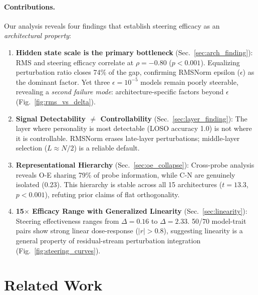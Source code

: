 \documentclass{article}
\begin{document}
\paragraph{Contributions.} Our analysis reveals four findings that establish steering efficacy as an \emph{architectural property}:
\begin{enumerate}[leftmargin=*,topsep=2pt,itemsep=1pt]
\item \textbf{Hidden state scale is the primary bottleneck} (Sec.~\ref{sec:arch_finding}): RMS and steering efficacy correlate at $\rho{=}{-}0.80$ ($p{<}0.001$). Equalizing perturbation ratio closes 74\% of the gap, confirming RMSNorm epsilon ($\epsilon$) as the dominant factor. Yet three $\epsilon{=}10^{-5}$ models remain poorly steerable, revealing a \emph{second failure mode}: architecture-specific factors beyond $\epsilon$ (Fig.~\ref{fig:rms_vs_delta}).
\item \textbf{Signal Detectability $\neq$ Controllability} (Sec.~\ref{sec:layer_finding}): The layer where personality is most detectable (LOSO accuracy 1.0) is not where it is controllable. RMSNorm erases late-layer perturbations; middle-layer selection ($L \approx N/2$) is a reliable default.
\item \textbf{Representational Hierarchy} (Sec.~\ref{sec:oe_collapse}): Cross-probe analysis reveals O-E sharing 79\% of probe information, while C-N are genuinely isolated ($0.23$). This hierarchy is stable across all 15 architectures ($t{=}13.3$, $p{<}0.001$), refuting prior claims of flat orthogonality.
\item \textbf{15$\times$ Efficacy Range with Generalized Linearity} (Sec.~\ref{sec:linearity}): Steering effectiveness ranges from $\Delta{=}0.16$ to $\Delta{=}2.33$. 50/70 model-trait pairs show strong linear dose-response ($|r|{>}0.8$), suggesting linearity is a general property of residual-stream perturbation integration (Fig.~\ref{fig:steering_curves}).
\end{enumerate}

\section{Related Work}\label{sec:related}
\end{document}
